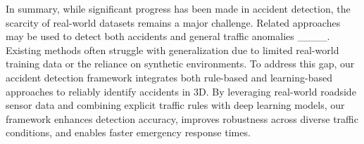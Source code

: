 In summary, while significant progress has been made in accident detection, the scarcity of real-world datasets remains a major challenge. 
Related approaches may be used to detect both accidents and general traffic anomalies ____. 
Existing methods often struggle with generalization due to limited real-world training data or the reliance on synthetic environments. To address this gap, our accident detection framework integrates both rule-based and learning-based approaches to reliably identify accidents in 3D. By leveraging real-world roadside sensor data and combining explicit traffic rules with deep learning models, our framework enhances detection accuracy, improves robustness across diverse traffic conditions, and enables faster emergency response times.